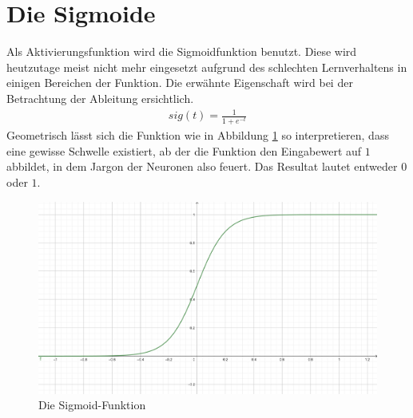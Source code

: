 \section{Die Sigmoide}
Als Aktivierungsfunktion wird die Sigmoidfunktion benutzt. Diese wird heutzutage meist nicht mehr eingesetzt aufgrund
des schlechten Lernverhaltens in einigen Bereichen der Funktion. Die erwähnte Eigenschaft wird bei der Betrachtung
der Ableitung ersichtlich.
\begin{align}
    sig(t) = \frac{1}{1 + e^{-t}}
\end{align}
Geometrisch lässt sich die Funktion wie in Abbildung \ref{fig:02_sigmoide} so interpretieren, dass eine gewisse Schwelle existiert, ab der die Funktion
den Eingabewert auf $1$ abbildet, in dem Jargon der Neuronen also \glqq feuert\grqq. Das Resultat lautet
entweder $0$ oder $1$.

\begin{figure}[h!]
    \begin{center}
        \includegraphics[width=0.6\linewidth]{../common/02_appendix/00_resources/02_sigmoide.png}
    \end{center}
    \caption{Die Sigmoid-Funktion}
    \label{fig:02_sigmoide}
\end{figure}

